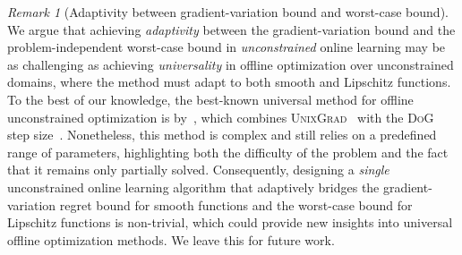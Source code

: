 \documentclass{article}
\theoremstyle{plain}
\theoremstyle{definition}
\theoremstyle{remark}
\newtheorem{remark}[theorem]{Remark}
\begin{document}
\begin{remark}[Adaptivity between gradient-variation bound and worst-case bound]\label{remark:adaptive}
We argue that achieving \emph{adaptivity} between the gradient-variation bound and the problem-independent worst-case bound in \emph{unconstrained} online learning may be as challenging as achieving \emph{universality} in offline optimization over unconstrained domains, where the method must adapt to both smooth and Lipschitz functions. To the best of our knowledge, the best-known universal method for offline unconstrained optimization is by~\cite{kreisler2024accelerated}, which combines \textsc{UnixGrad}~\cite{kavis2019unixgrad} with the \textsc{DoG} step size~\cite{ivgi2023dog}. Nonetheless, this method is complex and still relies on a predefined range of parameters, highlighting both the difficulty of the problem and the fact that it remains only partially solved. Consequently, designing a \emph{single} unconstrained online learning algorithm that adaptively bridges the gradient-variation regret bound for smooth functions and the worst-case bound for Lipschitz functions is non-trivial, which could provide new insights into universal offline optimization methods. We leave this for future work.
\end{remark}
\end{document}
